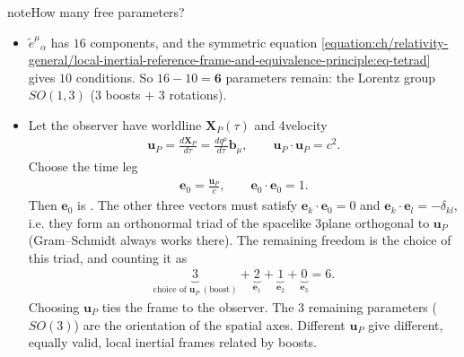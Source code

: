 \documentclass[letterpaper,10pt,english]{jupyterBook}
\begin{document}
\begin{sphinxadmonition}{note}{How many free parameters?}
\begin{itemize}
\item {} 
\sphinxAtStartPar
{} \(\tilde e^\mu{}_\alpha\) has \(16\) components, and the symmetric equation \eqref{equation:ch/relativity-general/local-inertial-reference-frame-and-equivalence-principle:eq-tetrad} gives \(10\) conditions. So \(16-10=\mathbf{6}\) parameters remain: the Lorentz group \(SO(1,3)\) (3 boosts + 3 rotations).

\item {} 
\sphinxAtStartPar
{} Let the observer have worldline \(\mathbf X_P(\tau)\) and 4\sphinxhyphen{}velocity
\begin{equation*}
\begin{split}
   \mathbf u_P=\frac{d\mathbf X_P}{d\tau}=\frac{dq^\mu}{d\tau}\mathbf b_\mu,\qquad \mathbf u_P\cdot\mathbf u_P=c^2 .
   \end{split}
\end{equation*}
\sphinxAtStartPar
Choose the time leg
\begin{equation*}
\begin{split}
   \mathbf e_0=\frac{\mathbf u_P}{c},\qquad \mathbf e_0\cdot\mathbf e_0=1 .
   \end{split}
\end{equation*}
\sphinxAtStartPar
Then \(\mathbf e_0\) is . The other three vectors must satisfy \(\mathbf e_k\cdot\mathbf e_0=0\) and \(\mathbf e_k\cdot\mathbf e_l=-\delta_{kl}\), i.e. they form an orthonormal triad of the spacelike 3\sphinxhyphen{}plane orthogonal to \(\mathbf u_P\) (Gram–Schmidt always works there). The remaining freedom is the choice of this triad, and counting it as
\begin{equation*}
\begin{split}
   \underbrace{3}_{\text{choice of }\mathbf u_P\ (\text{boost})}+\underbrace{2}_{\mathbf e_1}+\underbrace{1}_{\mathbf e_2}+\underbrace{0}_{\mathbf e_3}=6 .
   \end{split}
\end{equation*}
\sphinxAtStartPar
Choosing \(\mathbf u_P\) ties the frame to the observer. The \(3\) remaining parameters (\(SO(3)\)) are the orientation of the spatial axes. Different \(\mathbf u_P\) give different, equally valid, local inertial frames related by boosts.

\end{itemize}
\end{sphinxadmonition}
\end{document}
